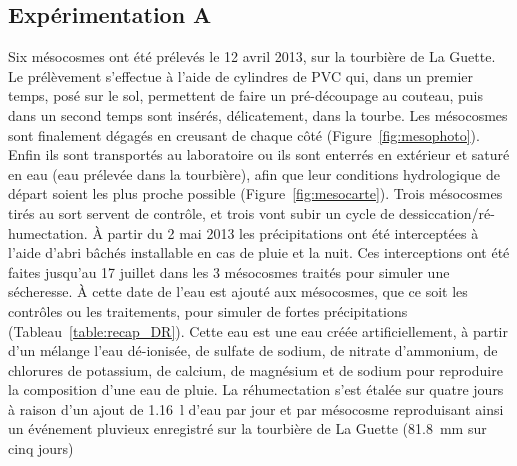 \subsection{Expérimentation A}
Six mésocosmes ont été prélevés le 12 avril 2013, sur la tourbière de La Guette.
Le prélèvement s'effectue à l'aide de cylindres de PVC qui, dans un premier temps, posé sur le sol, permettent de faire un pré-découpage au couteau, puis dans un second temps sont insérés, délicatement, dans la tourbe. 
Les mésocosmes sont finalement dégagés en creusant de chaque côté (Figure~\ref{fig:mesophoto}).
Enfin ils sont transportés au laboratoire ou ils sont enterrés en extérieur et saturé en eau (eau prélevée dans la tourbière), afin que leur conditions hydrologique de départ soient les plus proche possible (Figure~\ref{fig:mesocarte}).
Trois mésocosmes tirés au sort servent de contrôle, et trois vont subir un cycle de dessiccation/ré-humectation.
À partir du 2 mai 2013 les précipitations ont été interceptées à l'aide d'abri bâchés installable en cas de pluie et la nuit.
Ces interceptions ont été faites jusqu'au 17 juillet dans les 3 mésocosmes traités pour simuler une sécheresse.
À cette date de l'eau est ajouté aux mésocosmes, que ce soit les contrôles ou les traitements, pour simuler de fortes précipitations (Tableau~\ref{table:recap_DR}).
Cette eau est une eau créée artificiellement, à partir d'un mélange l'eau dé-ionisée, de sulfate de sodium, de nitrate d'ammonium, de chlorures de potassium, de calcium, de magnésium et de sodium pour reproduire la composition d'une eau de pluie.
La réhumectation s'est étalée sur quatre jours à raison d'un ajout de \SI{1.16}{\litre} d'eau par jour et par mésocosme reproduisant ainsi un événement pluvieux enregistré sur la tourbière de La Guette (\SI{81.8}{\milli\metre} sur cinq jours)


